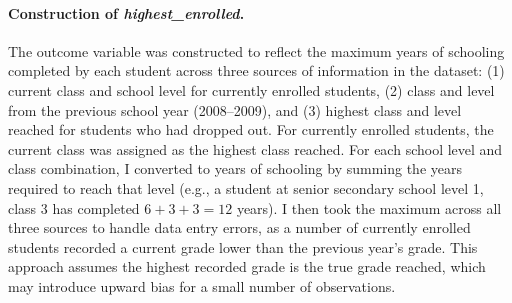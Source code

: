 \paragraph{Construction of \textit{highest\_enrolled}.}
The outcome variable was constructed to reflect the maximum years of
schooling completed by each student across three sources of information in
the dataset: (1) current class and school level for currently enrolled
students, (2) class and level from the previous school year (2008--2009),
and (3) highest class and level reached for students who had dropped out.
For currently enrolled students, the current class was assigned as the
highest class reached. For each school level and class combination, I
converted to years of schooling by summing the years required to reach that
level (e.g., a student at senior secondary school level 1, class 3 has
completed $6 + 3 + 3 = 12$ years). I then took the maximum across all three
sources to handle data entry errors, as a number of currently enrolled
students recorded a current grade lower than the previous year's grade. This
approach assumes the highest recorded grade is the true grade reached, which
may introduce upward bias for a small number of observations.
